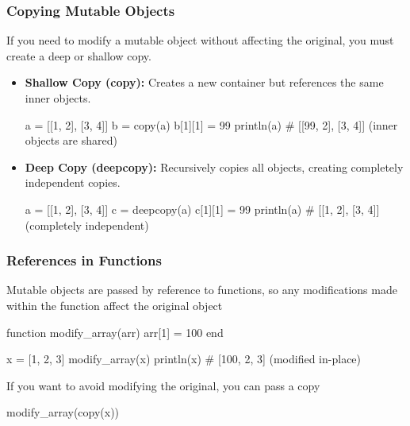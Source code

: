\documentclass{report}
\begin{document}
     \subsubsection{Copying Mutable Objects}
     \bigbreak \noindent 
     If you need to modify a mutable object without affecting the original, you must create a deep or shallow copy.
     \begin{itemize}
         \item \textbf{Shallow Copy (copy):} Creates a new container but references the same inner objects.
             \bigbreak \noindent 
             \begin{jlcode}
                 a = [[1, 2], [3, 4]]
                 b = copy(a)
                 b[1][1] = 99
                 println(a)  # [[99, 2], [3, 4]] (inner objects are shared)
             \end{jlcode}
         \item \textbf{Deep Copy (deepcopy):} Recursively copies all objects, creating completely independent copies.
             \bigbreak \noindent 
             \begin{jlcode}
                 a = [[1, 2], [3, 4]]
                 c = deepcopy(a)
                 c[1][1] = 99
                 println(a)  # [[1, 2], [3, 4]] (completely independent)
             \end{jlcode}
     \end{itemize}

     \bigbreak \noindent 
     \subsubsection{References in Functions}
     \bigbreak \noindent 
     Mutable objects are passed by reference to functions, so any modifications made within the function affect the original object
     \bigbreak \noindent 
     \begin{jlcode}
         function modify_array(arr)
             arr[1] = 100
         end

         x = [1, 2, 3]
         modify_array(x)
         println(x)  # [100, 2, 3] (modified in-place)
     \end{jlcode}
     \bigbreak \noindent 
     If you want to avoid modifying the original, you can pass a copy
     \bigbreak \noindent 
     \begin{jlcode}
     modify_array(copy(x))
     \end{jlcode}

     \bigbreak \noindent 
\end{document}

